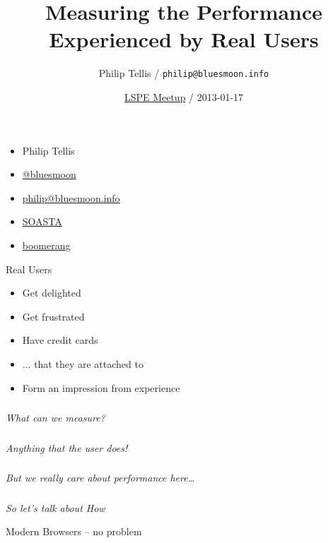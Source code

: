 \documentclass{beamer}
\author{Philip Tellis / \texttt{philip@bluesmoon.info}}
\title{Measuring the Performance Experienced by Real Users}
\date{\href{http://www.meetup.com/SF-Bay-Area-Large-Scale-Production-Engineering/events/92123162/}{LSPE Meetup} / 2013-01-17}
\newcommand{\innersplash}[1]{
  \begin{center}
    \Large \textrm{\textit{ #1 } }
  \end{center}
}
\newcommand{\splashslide}[2][{}]{
  \begin{frame}
  \frametitle{#1}
  \innersplash{#2}
  \end{frame}
}
\begin{document}
\begin{frame}
  \begin{itemize}
  \item Philip Tellis
  \item \href{http://twitter.com/bluesmoon}{@bluesmoon}
  \item \href{http://bluesmoon.info/}{philip@bluesmoon.info}
  \item \href{http://www.soasta.com/}{SOASTA}
  \item \href{http://lognormal.github.com/boomerang/doc/}{boomerang}
  \end{itemize}
\end{frame}

\begin{frame}
  \titlepage
\end{frame}

\begin{frame}{Real Users}
   {
    \begin{block}{}
      \begin{itemize}
        \item Get delighted
        \item<3-> Get frustrated
        \item<4-> Have credit cards
        \item<5-> ... that they are attached to
        \item<6-> Form an impression from experience
      \end{itemize}
    \end{block}
  }
\end{frame}

\splashslide{What can we measure?}

\splashslide{Anything that the user does! \\ \only<2->{(in the browser)}}

\splashslide{But we really care about performance here\ldots}

\splashslide{So let's talk about How}

\begin{frame}{Modern Browsers -- no problem}
\end{frame}
\end{document}
